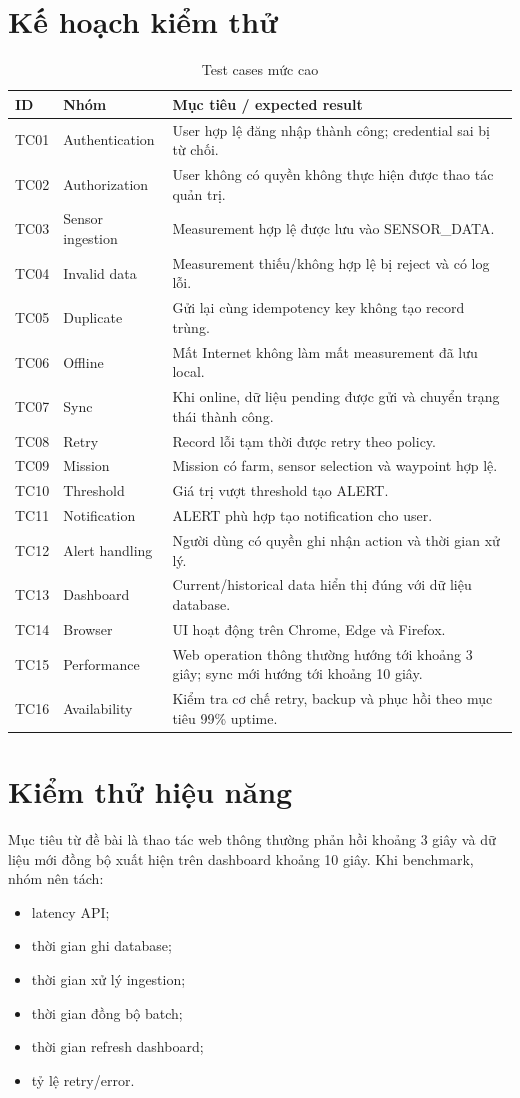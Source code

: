 \section{Kế hoạch kiểm thử}
\begin{longtable}{p{1.6cm}p{4cm}p{7cm}}
\caption{Test cases mức cao}\label{tab:test}\\
\toprule
ID & Nhóm & Mục tiêu / expected result \\
\midrule
TC01 & Authentication & User hợp lệ đăng nhập thành công; credential sai bị từ chối.\\
TC02 & Authorization & User không có quyền không thực hiện được thao tác quản trị.\\
TC03 & Sensor ingestion & Measurement hợp lệ được lưu vào SENSOR\_DATA.\\
TC04 & Invalid data & Measurement thiếu/không hợp lệ bị reject và có log lỗi.\\
TC05 & Duplicate & Gửi lại cùng idempotency key không tạo record trùng.\\
TC06 & Offline & Mất Internet không làm mất measurement đã lưu local.\\
TC07 & Sync & Khi online, dữ liệu pending được gửi và chuyển trạng thái thành công.\\
TC08 & Retry & Record lỗi tạm thời được retry theo policy.\\
TC09 & Mission & Mission có farm, sensor selection và waypoint hợp lệ.\\
TC10 & Threshold & Giá trị vượt threshold tạo ALERT.\\
TC11 & Notification & ALERT phù hợp tạo notification cho user.\\
TC12 & Alert handling & Người dùng có quyền ghi nhận action và thời gian xử lý.\\
TC13 & Dashboard & Current/historical data hiển thị đúng với dữ liệu database.\\
TC14 & Browser & UI hoạt động trên Chrome, Edge và Firefox.\\
TC15 & Performance & Web operation thông thường hướng tới khoảng 3 giây; sync mới hướng tới khoảng 10 giây.\\
TC16 & Availability & Kiểm tra cơ chế retry, backup và phục hồi theo mục tiêu 99\% uptime.\\
\bottomrule
\end{longtable}

\section{Kiểm thử hiệu năng}
Mục tiêu từ đề bài là thao tác web thông thường phản hồi khoảng 3 giây và dữ liệu mới đồng bộ xuất hiện trên dashboard khoảng 10 giây. Khi benchmark, nhóm nên tách:
\begin{itemize}
  \item latency API;
  \item thời gian ghi database;
  \item thời gian xử lý ingestion;
  \item thời gian đồng bộ batch;
  \item thời gian refresh dashboard;
  \item tỷ lệ retry/error.
\end{itemize}

